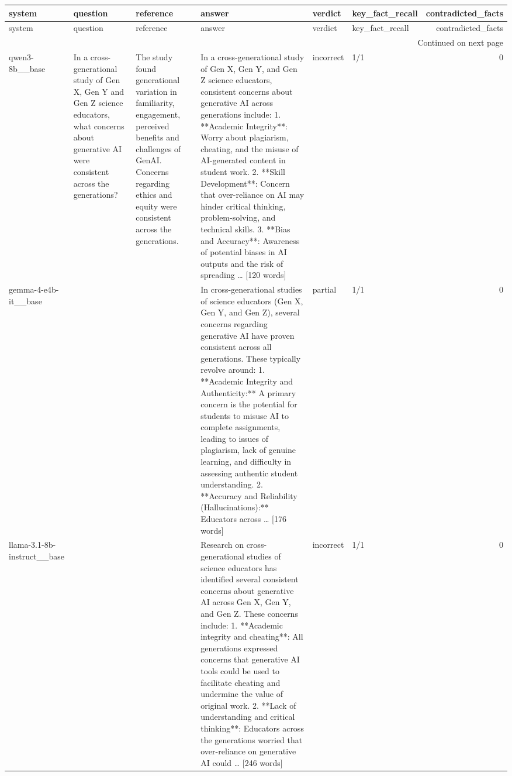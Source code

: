 \begin{longtable}{llllllr}
\toprule
system & question & reference & answer & verdict & key\_fact\_recall & contradicted\_facts \\
\midrule
\endfirsthead
\toprule
system & question & reference & answer & verdict & key\_fact\_recall & contradicted\_facts \\
\midrule
\endhead
\midrule
\multicolumn{7}{r}{Continued on next page} \\
\midrule
\endfoot
\bottomrule
\endlastfoot
qwen3-8b\_\_base & In a cross-generational study of Gen X, Gen Y and Gen Z science educators, what concerns about generative AI were consistent across the generations? & The study found generational variation in familiarity, engagement, perceived benefits and challenges of GenAI. Concerns regarding ethics and equity were consistent across the generations. & In a cross-generational study of Gen X, Gen Y, and Gen Z science educators, consistent concerns about generative AI across generations include: 1. **Academic Integrity**: Worry about plagiarism, cheating, and the misuse of AI-generated content in student work. 2. **Skill Development**: Concern that over-reliance on AI may hinder critical thinking, problem-solving, and technical skills. 3. **Bias and Accuracy**: Awareness of potential biases in AI outputs and the risk of spreading … [120 words] & incorrect & 1/1 & 0 \\
gemma-4-e4b-it\_\_base &  &  & In cross-generational studies of science educators (Gen X, Gen Y, and Gen Z), several concerns regarding generative AI have proven consistent across all generations. These typically revolve around: 1. **Academic Integrity and Authenticity:** A primary concern is the potential for students to misuse AI to complete assignments, leading to issues of plagiarism, lack of genuine learning, and difficulty in assessing authentic student understanding. 2. **Accuracy and Reliability (Hallucinations):** Educators across … [176 words] & partial & 1/1 & 0 \\
llama-3.1-8b-instruct\_\_base &  &  & Research on cross-generational studies of science educators has identified several consistent concerns about generative AI across Gen X, Gen Y, and Gen Z. These concerns include: 1. **Academic integrity and cheating**: All generations expressed concerns that generative AI tools could be used to facilitate cheating and undermine the value of original work. 2. **Lack of understanding and critical thinking**: Educators across the generations worried that over-reliance on generative AI could … [246 words] & incorrect & 1/1 & 0 \\

\end{longtable}
